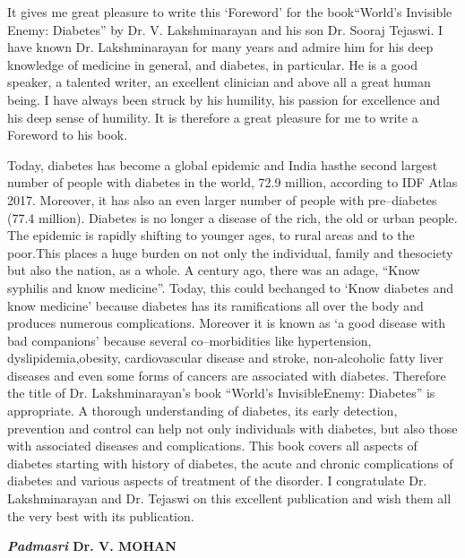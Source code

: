 It gives me great pleasure to write this ‘Foreword’ for the book\break “World's Invisible Enemy: Diabetes” by Dr. V. Lakshminara\-yan and his son Dr. Sooraj Tejaswi. I have known Dr. Lakshminarayan for many years and admire him for his deep knowledge of medicine in general, and diabetes, in particular. He is a good speaker, a talented writer, an excellent clinician and above all a great human being. I have always been struck by his humi\-lity, his passion for excellence and his deep sense of humility. It is therefore a great pleasure for me to write a Foreword to his book.

Today, diabetes has become a global epidemic and India has\break the second largest number of people with diabetes in the world, 72.9 million, according to IDF Atlas 2017. Moreover, it has also an even larger number of people with pre–diabetes (77.4 million). Diabetes is no longer a disease of the rich, the old or urban people. The epidemic is rapidly shifting to younger ages, to rural areas and to the poor.\break This places a huge burden on not only the individual, family and the\break society but also the nation, as a whole. A century ago, there was an adage, “Know syphilis and know medicine”. Today, this could be\break changed to ‘Know diabetes and know medicine’ because diabetes has its ramifications all over the body and produces numerous complications. Moreover it is known as ‘a good di\-sease with bad companions’ because seve\-ral co–morbidities like hypertension, dyslipidemia,\break obesity, cardiovascular disease and stroke, non-alcoholic fatty liver diseases and even some forms of cancers are associated with diabetes. Therefore the title of Dr. Lakshminarayan’s book “World's Invisible\break Enemy: Diabetes” is appropriate. A thorough understanding of diabetes, its early detection, prevention and control can help not only individuals with diabetes, but also those with associated diseases and compli\-cations. This book covers all aspects of diabetes starting with history of diabetes, the acute and chronic complications of diabetes and various aspects of treatment of the disorder. I congra\-tulate Dr. Lakshminarayan and Dr. Tejaswi on this exce\-llent publication and wish them all the very best with its publication.

\begin{flushright}
\textbf{\textit{Padmasri} Dr. V. MOHAN}
\end{flushright}

